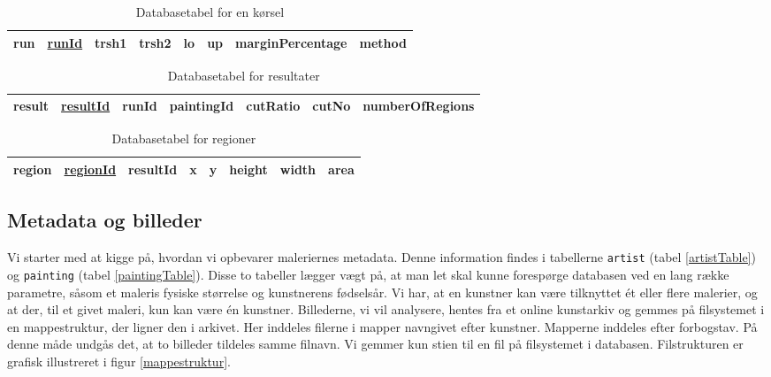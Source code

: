 {\begin{table}[!h]
    \centering
    \begin{tabular}{|l||c|c|c|c|c|c|c|}
        \hline
        \bf{run} \hspace{0.5cm} & \underline{runId} & trsh1 & trsh2 & lo & up & marginPercentage & method \\\hline
    \end{tabular}
    \caption{Databasetabel for en kørsel}
    \label{runTable}
\end{table}

\begin{table}[!h]
    \centering
    \begin{tabular}{|l||c|c|c|c|c|c|}
        \hline
        \bf{result} \hspace{0.5cm} & \underline{resultId} & runId & paintingId & cutRatio & cutNo & numberOfRegions \\\hline
    \end{tabular}
    \caption{Databasetabel for resultater}
    \label{resultTable}
\end{table}

\begin{table}[!h]
    \centering
    \begin{tabular}{|l||c|c|c|c|c|c|c|}
        \hline
        \bf{region} \hspace{0.5cm} & \underline{regionId} & resultId & x & y & height & width & area \\\hline
    \end{tabular}
    \caption{Databasetabel for regioner}
    \label{regionTable}
\end{table}

\subsection{Metadata og billeder\label{section_opbv_billeder}}
Vi starter med at kigge på, hvordan vi opbevarer maleriernes metadata.
Denne information findes i tabellerne \texttt{artist} (tabel
\ref{artistTable}) og \texttt{painting} (tabel \ref{paintingTable}).
Disse to tabeller lægger vægt på, at man let skal kunne forespørge
databasen ved en lang række parametre, såsom et maleris fysiske
størrelse og kunstnerens fødselsår. Vi har, at en kunstner kan være
tilknyttet ét eller flere malerier, og at der, til et givet maleri, kun
kan være én kunstner. Billederne, vi vil analysere, hentes fra et online
kunstarkiv og gemmes på filsystemet i en mappestruktur, der ligner den i
arkivet. Her inddeles filerne i mapper navngivet efter kunstner.
Mapperne inddeles efter forbogstav. På denne måde undgås det, at to
billeder tildeles samme filnavn. Vi gemmer kun stien til en fil på
filsystemet i databasen. Filstrukturen er grafisk illustreret i figur
\ref{mappestruktur}.

}
